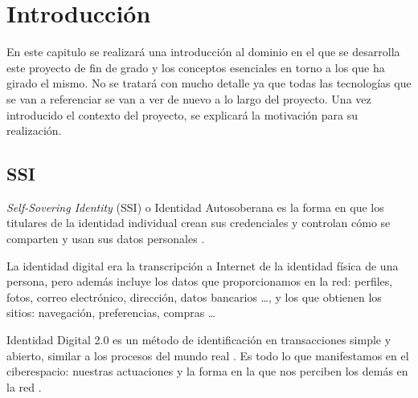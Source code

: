 \chapter{Introducción}\label{Introducción}

\thispagestyle{fancy}


En este capitulo se realizará una introducción al dominio en el que se desarrolla este proyecto de fin de grado y los conceptos esenciales en torno a los que ha girado el mismo. No se tratará con mucho detalle ya que todas las tecnologías que se van a referenciar se van a ver de nuevo a lo largo del proyecto. Una vez introducido el contexto del proyecto, se explicará la motivación para su realización.

\section{SSI}
\textit{Self-Sovering Identity} (SSI) o Identidad Autosoberana es la forma en que los titulares de la identidad individual crean sus credenciales y controlan cómo se comparten y usan sus datos personales \cite{web:ssi_wikipedia}.

La identidad digital era la transcripción a Internet de la identidad física de una persona, pero además incluye los datos que proporcionamos en la red: perfiles, fotos, correo electrónico, dirección, datos bancarios \dots,  y los que obtienen los sitios: navegación, preferencias, compras \dots

Identidad Digital 2.0 es un método de identificación en transacciones simple y abierto, similar a los procesos del mundo real \cite{web:identidad2o_wikipedia}. Es todo lo que manifestamos en el ciberespacio: nuestras actuaciones y la forma en la que nos perciben los demás en la red \cite{web:participacion}.

